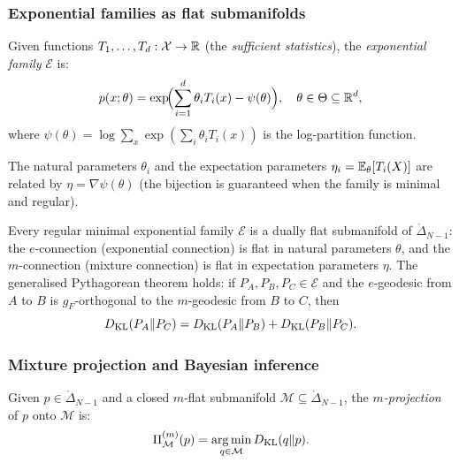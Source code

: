 \subsubsection{Exponential families as flat submanifolds}

\begin{definition}\label{def:exp-family}
Given functions $T_1,\ldots,T_d : \mathcal{X}\to\mathbb{R}$ (the \emph{sufficient statistics}),
the \emph{exponential family} $\mathcal{E}$ is:
\begin{equation}\label{eq:exp-family}
  p(x;\theta) = \exp\!\Bigl(\sum_{i=1}^d \theta_i T_i(x) - \psi(\theta)\Bigr),
  \quad \theta\in\Theta\subseteq\mathbb{R}^d,
\end{equation}
where $\psi(\theta)=\log\sum_x\exp(\sum_i\theta_i T_i(x))$ is the log-partition
function.
\end{definition}

The natural parameters $\theta_i$ and the expectation parameters
$\eta_i = \operatorname{\mathbb{E}}_\theta[T_i(X)]$ are related by $\eta = \nabla\psi(\theta)$
(the bijection is guaranteed when the family is minimal and regular).

\begin{theorem}
\label{thm:dual-flat}
Every regular minimal exponential family $\mathcal{E}$ is a dually flat submanifold
of $\mathring{\Delta}_{N-1}$: the $e$-connection (exponential connection) is flat
in natural parameters $\theta$, and the $m$-connection (mixture connection)
is flat in expectation parameters $\eta$.
The generalised Pythagorean theorem holds: if $P_A,P_B,P_C\in\mathcal{E}$ and the
$e$-geodesic from $A$ to $B$ is $g_F$-orthogonal to the $m$-geodesic from $B$
to $C$, then
\begin{equation}\label{eq:pythagoras}
  D_{\mathrm{KL}}(P_A\|P_C) = D_{\mathrm{KL}}(P_A\|P_B) + D_{\mathrm{KL}}(P_B\|P_C).
\end{equation}
\end{theorem}

\subsubsection{Mixture projection and Bayesian inference}

\begin{definition}[$m$-Projection]\label{def:m-proj}
Given $p\in\mathring{\Delta}_{N-1}$ and a closed $m$-flat submanifold
$\mathcal{M}\subseteq\mathring{\Delta}_{N-1}$, the \emph{$m$-projection} of $p$ onto $\mathcal{M}$ is:
\begin{equation}\label{eq:m-proj}
  \Pi_\mathcal{M}^{(m)}(p) = \operatorname*{arg\,min}_{q\in\mathcal{M}} D_{\mathrm{KL}}(q\|p).
\end{equation}
\end{definition}

